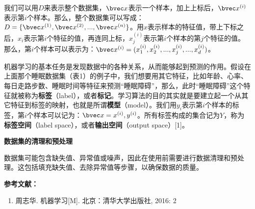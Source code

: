 我们可以用$D$来表示整个数据集，$\bvec x$表示一个样本，加上上标后，$\bvec x^{(i)}$表示第$i$个样本。那么，整个数据集可以写成：$D=\{\bvec x^{(1)}, \bvec x^{(2)}, ..., \bvec x^{(n)}\}$。用$x$表示样本的特征值，带上下标之后，$x_i$表示第$i$个特征的值，再连同上标，$x^{(i)}_j$表示第$i$个样本的第$j$个特征的值。那么，第$i$个样本可以表示为：$\bvec x^{(i)}=(x^{(i)}_1, x^{(i)}_2, ..., x^{(i)}_j, ..., x^{(i)}_d)$。

机器学习的基本任务是发现数据中的各种关系，从而能够起到预测的作用。假设在上面那个睡眠数据集（表1）的例子中，我们想要用其它特征，比如年龄、心率、每日走路步数、睡眠时间等特征来预测“睡眠障碍”，那么，此时“睡眠障碍”这个特征就被称为\textbf{标签}（label），或者\textbf{标记}。学习算法的目的其实就是要建立起一个从其它特征到标签的映射，也就是所谓\textbf{模型}（model）。我们用$y_i$表示第$i$个样本的标签，第$i$个样本可以记为：$\bvec x=x^{(i)}, y^{(i)}$。所有标签构成的集合记为$Y$，称为\textbf{标签空间}（label space），或者\textbf{输出空间}（output space）[1]。

\textbf{数据集的清理和预处理}

数据集可能包含缺失值、异常值或噪声，因此在使用前需要进行数据清理和预处理。这包括填充缺失值、去除异常值等步骤，以确保数据的质量。

\textbf{参考文献：}
\begin{enumerate}
\item 周志华. 机器学习[M]. 北京：清华大学出版社, 2016: 2
\end{enumerate}
